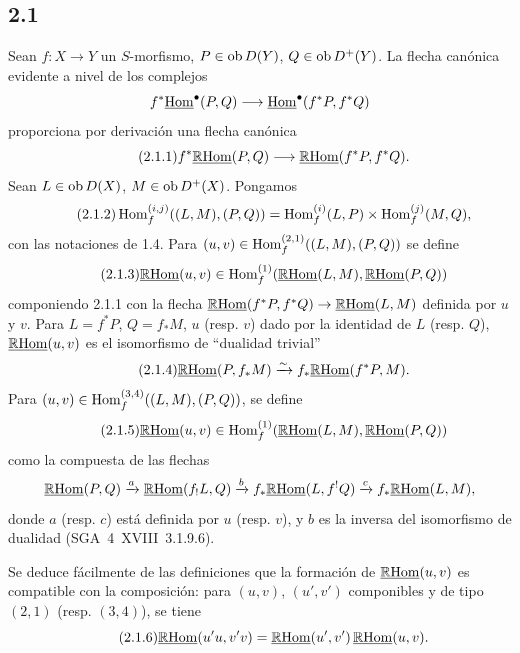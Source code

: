 \subsection*{2.1}
Sean $f:X\to Y$ un $S$-morfismo, $P\in\operatorname{ob} D(Y)$, $Q\in\operatorname{ob} D^{+}(Y)$. La flecha canónica evidente a nivel de los complejos
\[
f^{*}\underline{\operatorname{Hom}}^{\bullet}(P,Q)\longrightarrow\underline{\operatorname{Hom}}^{\bullet}(f^{*}P,f^{*}Q)
\]
proporciona por derivación una flecha canónica
\begin{equation}\tag{2.1.1}
f^{*}\underline{\mathbb{R}\mathrm{Hom}}(P,Q)\longrightarrow\underline{\mathbb{R}\mathrm{Hom}}(f^{*}P,f^{*}Q).
\end{equation}
Sean $L\in\operatorname{ob} D(X)$, $M\in\operatorname{ob} D^{+}(X)$. Pongamos
\begin{equation}\tag{2.1.2}
\operatorname{Hom}_f^{(i,j)}((L,M),(P,Q))=\operatorname{Hom}_f^{(i)}(L,P)\times\operatorname{Hom}_f^{(j)}(M,Q),
\end{equation}
con las notaciones de 1.4. Para $(u,v)\in\operatorname{Hom}_f^{(2,1)}((L,M),(P,Q))$ se define
\begin{equation}\tag{2.1.3}
\underline{\mathbb{R}\mathrm{Hom}}(u,v)\in\operatorname{Hom}_f^{(1)}(\underline{\mathbb{R}\mathrm{Hom}}(L,M),\underline{\mathbb{R}\mathrm{Hom}}(P,Q))
\end{equation}
componiendo 2.1.1 con la flecha $\underline{\mathbb{R}\mathrm{Hom}}(f^{*}P,f^{*}Q)\to\underline{\mathbb{R}\mathrm{Hom}}(L,M)$ definida por $u$ y $v$. Para $L=f^{*}P$, $Q=f_{*}M$, $u$ (resp. $v$) dado por la identidad de $L$ (resp. $Q$), $\underline{\mathbb{R}\mathrm{Hom}}(u,v)$ es el isomorfismo de ``dualidad trivial''
\begin{equation}\tag{2.1.4}
\underline{\mathbb{R}\mathrm{Hom}}(P,f_{*}M)\xrightarrow{\sim}f_{*}\underline{\mathbb{R}\mathrm{Hom}}(f^{*}P,M).
\end{equation}
Para $(u,v)\in\operatorname{Hom}_f^{(3,4)}((L,M),(P,Q))$, se define
\begin{equation}\tag{2.1.5}
\underline{\mathbb{R}\mathrm{Hom}}(u,v)\in\operatorname{Hom}_f^{(1)}(\underline{\mathbb{R}\mathrm{Hom}}(L,M),\underline{\mathbb{R}\mathrm{Hom}}(P,Q))
\end{equation}
como la compuesta de las flechas
\[
\underline{\mathbb{R}\mathrm{Hom}}(P,Q)\xrightarrow{a}\underline{\mathbb{R}\mathrm{Hom}}(f_{!}L,Q)\xrightarrow{b}f_{*}\underline{\mathbb{R}\mathrm{Hom}}(L,f^{!}Q)\xrightarrow{c}f_{*}\underline{\mathbb{R}\mathrm{Hom}}(L,M),
\]
donde $a$ (resp. $c$) está definida por $u$ (resp. $v$), y $b$ es la inversa del isomorfismo de dualidad (SGA~4~XVIII~3.1.9.6).

Se deduce fácilmente de las definiciones que la formación de $\underline{\mathbb{R}\mathrm{Hom}}(u,v)$ es compatible con la composición: para $(u,v)$, $(u',v')$ componibles y de tipo $(2,1)$ (resp. $(3,4)$), se tiene
\begin{equation}\tag{2.1.6}
\underline{\mathbb{R}\mathrm{Hom}}(u'u,v'v)=\underline{\mathbb{R}\mathrm{Hom}}(u',v')\,\underline{\mathbb{R}\mathrm{Hom}}(u,v).
\end{equation}

